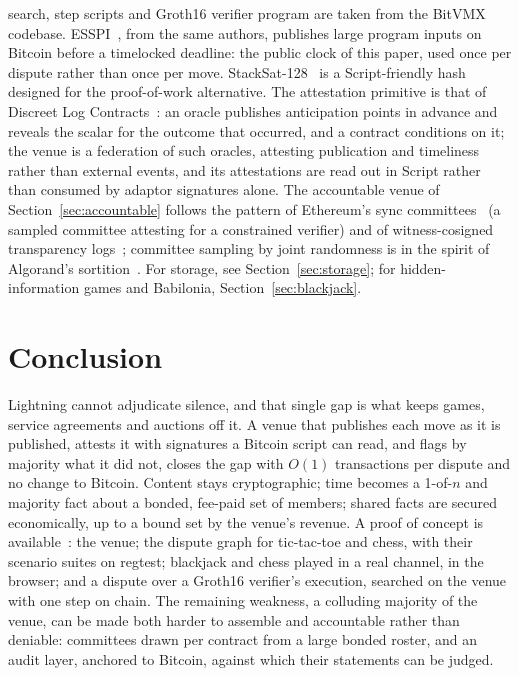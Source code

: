 \documentclass[11pt]{article}
\begin{document}
search, step scripts and Groth16 verifier program are taken from the
BitVMX codebase. ESSPI~\cite{esspi}, from the same authors, publishes
large program inputs on Bitcoin before a timelocked deadline: the
public clock of this paper, used once per dispute rather than once per
move.
StackSat-128~\cite{stacksat} is a Script-friendly hash designed for the
proof-of-work alternative. The attestation primitive is that of Discreet
Log Contracts~\cite{dlc}: an oracle publishes anticipation points in
advance and reveals the scalar for the outcome that occurred, and a
contract conditions on it; the venue is a federation of such oracles,
attesting publication and timeliness rather than external events, and
its attestations are read out in Script rather than consumed by adaptor
signatures alone. The accountable venue of
Section~\ref{sec:accountable} follows the pattern of Ethereum's sync
committees~\cite{synccommittee} (a sampled committee attesting for a
constrained verifier) and of witness-cosigned transparency
logs~\cite{ct}; committee sampling by joint randomness is in the spirit
of Algorand's sortition~\cite{algorand}. For storage, see
Section~\ref{sec:storage}; for hidden-information games and Babilonia, Section~\ref{sec:blackjack}.

\section{Conclusion}

Lightning cannot adjudicate silence, and that single gap is what keeps
games, service agreements and auctions off it. A venue that publishes
each move as it is published, attests it with signatures a Bitcoin script can
read, and flags by majority what it did not, closes the gap with
$O(1)$ transactions per dispute and no change to Bitcoin. Content stays
cryptographic; time becomes a 1-of-$n$ and majority fact about a bonded,
fee-paid set of members; shared facts are secured economically, up to a
bound set by the venue's revenue. A proof of concept is
available~\cite{lngapcode}: the venue; the dispute graph for
tic-tac-toe and chess, with their scenario suites on regtest; blackjack
and chess played in a real channel, in the browser; and a dispute over
a Groth16 verifier's execution, searched on the venue with one step on
chain. The remaining weakness, a colluding
majority of the venue, can be made both harder to assemble and
accountable rather than deniable: committees drawn per contract from a
large bonded roster, and an audit layer, anchored to Bitcoin, against
which their statements can be judged.
\end{document}
